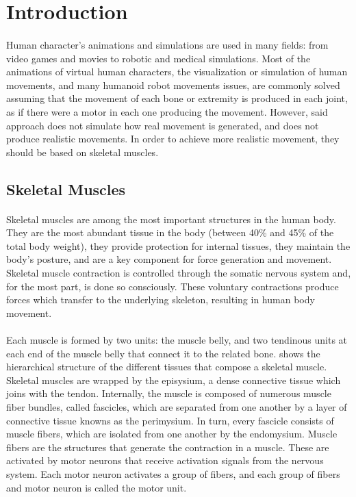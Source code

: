 \section{Introduction}
\label{Introduction}

\paragraph{}Human character’s animations and simulations are used in many fields: from video games and movies to robotic and medical simulations. Most of the animations of virtual human characters, the visualization or simulation of human movements, and many humanoid robot movements issues, are commonly solved assuming that the movement of each bone or extremity is produced in each joint, as if there were a motor in each one producing the movement. However, said approach does not simulate how real movement is generated, and does not produce realistic movements. In order to achieve more realistic movement, they  should be based on skeletal muscles.

\subsection{Skeletal Muscles}

\paragraph{}Skeletal muscles are among the most important structures in the human body. They are the most abundant tissue in the body (between 40\% and 45\% of the total body weight), they provide protection for internal tissues, they maintain the body's posture, and are a key component for force generation and movement. Skeletal muscle contraction is controlled through the somatic nervous system and, for the most part, is done so consciously. These voluntary contractions produce forces which transfer to the underlying skeleton, resulting in human body movement. 

\paragraph{}Each muscle is formed by two units: the muscle belly, and two tendinous units at each end of the muscle belly that connect it to the related bone.  shows the hierarchical structure of the different tissues that compose a skeletal muscle. Skeletal muscles are wrapped by the episysium, a dense connective tissue which joins with the tendon. Internally, the muscle is composed of numerous muscle fiber bundles, called fascicles, which are separated from one another by a layer of connective tissue knowns as the perimysium. In turn, every fascicle consists of muscle fibers, which are isolated from one another by the endomysium. Muscle fibers are the structures that generate the contraction in a muscle. These are activated by  motor neurons that receive activation signals from the nervous system. Each motor neuron activates a group of fibers, and each group of fibers and motor neuron is called the motor unit.

